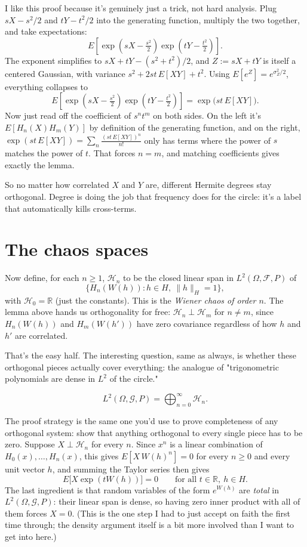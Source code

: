 I like this proof because it's genuinely just a trick, not hard analysis. Plug $sX - s^2/2$ and $tY - t^2/2$ into the generating function, multiply the two together, and take expectations:
$$
E\!\left[\exp\!\left(sX - \tfrac{s^2}{2}\right)\exp\!\left(tY - \tfrac{t^2}{2}\right)\right].
$$
The exponent simplifies to $sX + tY - (s^2+t^2)/2$, and $Z := sX + tY$ is itself a centered Gaussian, with variance $s^2 + 2st\,E[XY] + t^2$. Using $E[e^Z] = e^{\sigma_Z^2/2}$, everything collapses to
$$
E\!\left[\exp\!\left(sX - \tfrac{s^2}{2}\right)\exp\!\left(tY - \tfrac{t^2}{2}\right)\right] = \exp\big(st\,E[XY]\big).
$$
Now just read off the coefficient of $s^nt^m$ on both sides. On the left it's $E[H_n(X)H_m(Y)]$ by definition of the generating function, and on the right, $\exp(st\,E[XY]) = \sum_n \frac{(st\,E[XY])^n}{n!}$ only has terms where the power of $s$ matches the power of $t$. That forces $n = m$, and matching coefficients gives exactly the lemma.

So no matter how correlated $X$ and $Y$ are, different Hermite degrees stay orthogonal. Degree is doing the job that frequency does for the circle: it's a label that automatically kills cross-terms.

\section{The chaos spaces}

Now define, for each $n \ge 1$, $\mathcal H_n$ to be the closed linear span in $L^2(\Omega, \mathcal F, P)$ of
$$
\{H_n(W(h)) : h \in H,\ \|h\|_H = 1\},
$$
with $\mathcal H_0 = \mathbb{R}$ (just the constants). This is the \emph{Wiener chaos of order $n$}. The lemma above hands us orthogonality for free: $\mathcal H_n \perp \mathcal H_m$ for $n \ne m$, since $H_n(W(h))$ and $H_m(W(h'))$ have zero covariance regardless of how $h$ and $h'$ are correlated.

That's the easy half. The interesting question, same as always, is whether these orthogonal pieces actually cover everything: the analogue of "trigonometric polynomials are dense in $L^2$ of the circle."

\begin{theorem}
\label{chaos-decomp}
$$
L^2(\Omega, \mathcal G, P) = \bigoplus_{n=0}^\infty \mathcal H_n.
$$
\end{theorem}

The proof strategy is the same one you'd use to prove completeness of any orthogonal system: show that anything orthogonal to every single piece has to be zero. Suppose $X \perp \mathcal H_n$ for every $n$. Since $x^n$ is a linear combination of $H_0(x), \dots, H_n(x)$, this gives $E[X\,W(h)^n] = 0$ for every $n \ge 0$ and every unit vector $h$, and summing the Taylor series then gives
$$
E\big[X\exp(tW(h))\big] = 0 \qquad \text{for all } t \in \mathbb{R},\ h \in H.
$$
The last ingredient is that random variables of the form $e^{W(h)}$ are \emph{total} in $L^2(\Omega, \mathcal G, P)$: their linear span is dense, so having zero inner product with all of them forces $X = 0$. (This is the one step I had to just accept on faith the first time through; the density argument itself is a bit more involved than I want to get into here.)

